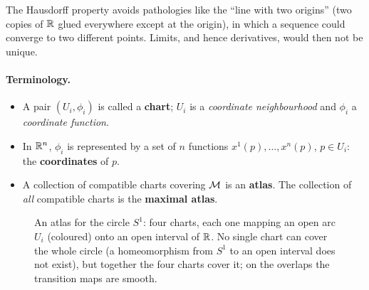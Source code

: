 \begin{remarkbox}
The Hausdorff property avoids pathologies like the ``line with two origins'' (two copies of $\mathbb{R}$ glued everywhere except at the origin), in which a sequence could converge to two different points. Limits, and hence derivatives, would then not be unique.
\end{remarkbox}

\paragraph{Terminology.}
\begin{itemize}[nosep]
  \item A pair $(U_i,\phi_i)$ is called a \textbf{chart}; $U_i$ is a \emph{coordinate neighbourhood} and $\phi_i$ a \emph{coordinate function}.
  \item In $\mathbb{R}^n$, $\phi_i$ is represented by a set of $n$ functions $x^1(p),\dots,x^n(p)$, $p\in U_i$: the \textbf{coordinates} of $p$.
  \item A collection of compatible charts covering $\mathcal{M}$ is an \textbf{atlas}. The collection of \emph{all} compatible charts is the \textbf{maximal atlas}.
\end{itemize}

\begin{figure}[ht]
\centering
{}
\caption{An atlas for the circle $S^1$: four charts, each one mapping an open arc $U_i$ (coloured) onto an open interval of $\mathbb{R}$. No single chart can cover the whole circle (a homeomorphism from $S^1$ to an open interval does not exist), but together the four charts cover it; on the overlaps the transition maps are smooth.}
\label{fig:atlas}
\end{figure}

